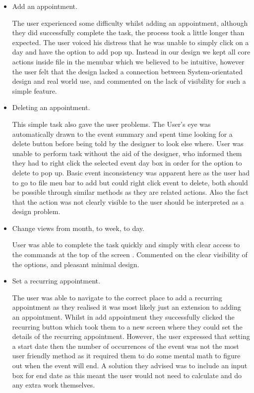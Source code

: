 \documentclass{article}
\begin{document}
\begin{itemize}
\item Add an appointment.

The user experienced some difficulty whilst adding an appointment,
although they did successfully complete the task, the process took a
little longer than expected. The user voiced his distress that he was
unable to simply click on a day and have the option to add pop up.
Instead in our design we kept all core actions inside file in the
menubar which we believed to be intuitive, however the user felt that
the design lacked a connection between System-orientated design and
real world use, and commented on the lack of visibility for such a
simple feature.


\item Deleting an appointment.

This simple task also gave the user problems. The User's eye was
automatically drawn to the event summary and spent time looking for a
delete button before being told by 
the designer to look else where. User was unable to perform task without
the aid of the designer, who informed them they had to right click the
selected event day box in order for the option to delete to pop up.
Basic event inconsistency was apparent here as the user had to go to
file meu bar to add but could right click event to delete, both should
be possible through similar methods as they are related actions. Also
the fact that the action was not clearly visible to the user should be
interpreted as a design problem.

\item Change views from month, to week, to day.

User was able to complete the task quickly and simply with clear access
to the commands at the top of the screen . Commented on the clear
visibility of the options, and pleasant minimal design.

\item Set a recurring appointment.

The user was able to navigate to the correct place to add a recurring
appointment as they realised it was most likely just an extension to
adding an appointment. Whilst in add appointment they successfully
clicked the recurring button which took them to a new screen where they
could set the details of the recurring appointment. However, the user
expressed that setting a start date then the number of occurrences of
the event was not the most user friendly method as it required them to
do some mental math to figure out when the event will end. A solution
they advised was to include an input box for end date as this meant 
the user would not need to calculate and do any extra work themselves.



\end{itemize}
\end{document}
